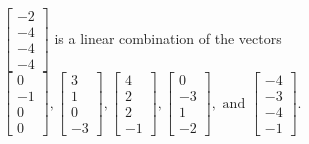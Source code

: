 \begin{exercise}
\begin{exerciseStatement}
  \end{exerciseStatement}
  \begin{exerciseAnswer}
   \(\left[\begin{array}{c}
-2 \\
-4 \\
-4 \\
-4
\end{array}\right]\) 
  	 is  
	a linear combination of the vectors \(\left[\begin{array}{c}
0 \\
-1 \\
0 \\
0
\end{array}\right] , \left[\begin{array}{c}
3 \\
1 \\
0 \\
-3
\end{array}\right] , \left[\begin{array}{c}
4 \\
2 \\
2 \\
-1
\end{array}\right] , \left[\begin{array}{c}
0 \\
-3 \\
1 \\
-2
\end{array}\right] , \text{ and } \left[\begin{array}{c}
-4 \\
-3 \\
-4 \\
-1
\end{array}\right]\).

	
  


  \end{exerciseAnswer}
\end{exercise}